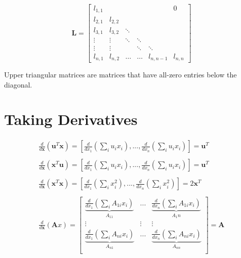 \begin{equation}
\mathbf{L} = \left[\begin{array}{cccccc} l_{1,1}&&&&&0\\l_{2,1}&l_{2,2}&&&&\\l_{3,1}&l_{3,2}&\ddots&&&\\  \vdots&\vdots&\ddots&\ddots&&\\ \vdots&\vdots&&\ddots&\ddots&\\  l_{n,1}&l_{n,2}&\hdots&\hdots&l_{n,n-1}&l_{n,n}\end{array}\right]
\end{equation}

Upper triangular matrices are matrices that have all-zero entries below the diagonal.

\section{Taking Derivatives}

\begin{equation}
\begin{array}{l}
\frac{d}{d\mathbf{x}} \left(\mathbf{u}^T\mathbf{x}\right) = \left[\frac{d}{dx_1}\left(\sum_i u_i x_i\right),...,\frac{d}{dx_n}\left(\sum_i u_i x_i\right)\right] = \mathbf{u}^T\\
\\
\frac{d}{d\mathbf{x}} \left(\mathbf{x}^T\mathbf{u}\right) = \left[\frac{d}{dx_1}\left(\sum_i u_i x_i\right),...,\frac{d}{dx_n}\left(\sum_i u_i x_i\right)\right] = \mathbf{u}^T\\
\\
\frac{d}{d\mathbf{x}} \left(\mathbf{x}^T\mathbf{x}\right) = \left[\frac{d}{dx_1}\left(\sum_i x_i^2\right),...,\frac{d}{dx_n}\left(\sum_i x_i^2\right)\right] = 2\mathbf{x}^T\\
\\
\frac{d}{d\mathbf{x}} \left(\mathbf{A}x\right) = \left[
\begin{array}{ccc} 
\underbrace{\frac{d}{dx_1}\left(\sum_i A_{1i} x_i\right)}_{A_{11}} &...& \underbrace{\frac{d}{dx_n}\left(\sum_i A_{1i} x_i\right)}_{A_1n}\\
\vdots&\vdots&\vdots\\
\underbrace{\frac{d}{dx_1}\left(\sum_i A_{ni} x_i\right)}_{A_{n1}} &...& \underbrace{\frac{d}{dx_n}\left(\sum_i A_{ni} x_i\right)}_{A_{nn}}\\
\end{array}\right] = \mathbf{A}\\
\end{array}
\end{equation}


\chapauthor{}

